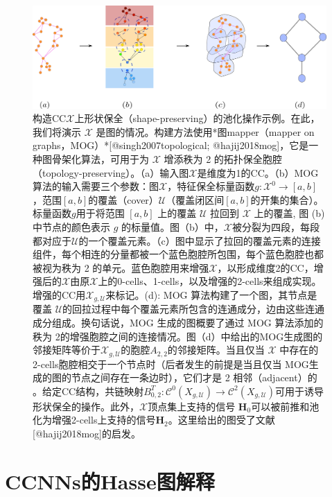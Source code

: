 \documentclass[
  12pt,
]{krantz}
\begin{document}
\begin{figure}

{\centering \includegraphics{figures/graph_tda} 

}

\caption{构造CC$\mathcal{X}$上形状保全（shape-preserving）的池化操作示例。在此，我们将演示 $\mathcal{X}$ 是图的情况。构建方法使用*图mapper（mapper on graphs，MOG）*[@singh2007topological; @hajij2018mog]，它是一种图骨架化算法，可用于为 $\mathcal{X}$ 增添秩为 2 的拓扑保全胞腔（topology-preserving）。（a）输入图$\mathcal{X}$是维度为1的CC。（b）MOG算法的输入需要三个参数：图$\mathcal{X}$，特征保全标量函数$g\colon\mathcal{X}^0\to [a,b]$，范围$[a,b]$的覆盖（cover）$\mathcal{U}$（覆盖闭区间$[a,b]$的开集的集合）。标量函数$g$用于将范围 $[a,b]$ 上的覆盖 $\mathcal{U}$ 拉回到 $\mathcal{X}$ 上的覆盖, 图 (b) 中节点的颜色表示 $g$ 的标量值。图（b）中，$\mathcal{X}$被分裂为四段，每段都对应于$\mathcal{U}$的一个覆盖元素。（c）图中显示了拉回的覆盖元素的连接组件，每个相连的分量都被一个蓝色胞腔所包围，每个蓝色胞腔也都被视为秩为 2 的单元。蓝色胞腔用来增强$\mathcal{X}$，以形成维度2的CC，增强后的$\mathcal{X}$由原$\mathcal{X}$上的0-cells、1-cells，以及增强的2-cells来组成实现。增强的CC用$\mathcal{X}_{g,\mathcal{U}}$来标记。(d): MOG 算法构建了一个图，其节点是覆盖 $\mathcal{U}$的回拉过程中每个覆盖元素所包含的连通成分，边由这些连通成分组成。换句话说，MOG 生成的图概要了通过 MOG 算法添加的秩为 2的增强胞腔之间的连接情况。图（d）中给出的MOG生成图的邻接矩阵等价于$\mathcal{X}_{g,\mathcal{U}}$的胞腔$A_{2,2}$的邻接矩阵。当且仅当 $\mathcal{X}$ 中存在的 2-cells胞腔相交于一个节点时（后者发生的前提是当且仅当 MOG生成的图的节点之间存在一条边时），它们才是 2 相邻（adjacent）的 。给定CC结构，共链映射$B_{0,2}^T\colon\mathcal{C}^0(X_{g,\mathcal{U}})\to \mathcal{C}^2(X_{g,\mathcal{U}})$可用于诱导形状保全的操作。此外，$\mathcal{X}$顶点集上支持的信号 $\mathbf{H}_0$可以被前推和池化为增强2-cells上支持的信号$\mathbf{H}_2$。这里给出的图受了文献 [@hajij2018mog]的启发。}\label{fig:graph-tda}
\end{figure}

\section{CCNNs的Hasse图解释}\label{hasse-graph-interpretation-of-ccnns-1}
\end{document}
